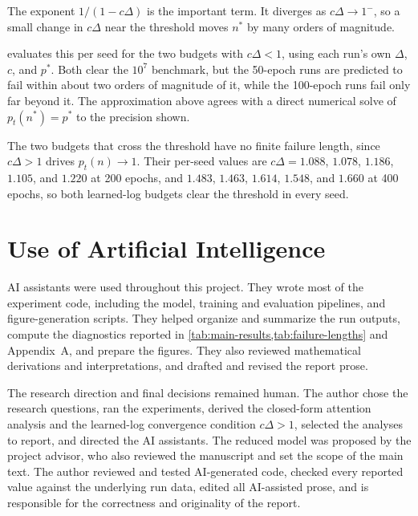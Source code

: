 \documentclass{article}
\begin{document}
The exponent $1/(1-c\Delta)$ is the important term. It diverges as
$c\Delta\to1^{-}$, so a small change in $c\Delta$ near the threshold moves
$n^{\ast}$ by many orders of magnitude.

 evaluates this per seed for the two budgets with
$c\Delta<1$, using each run's own $\Delta$, $c$, and $p^{\ast}$. Both clear the
$10^7$ benchmark, but the 50-epoch runs are predicted to fail within about two
orders of magnitude of it, while the 100-epoch runs fail only far beyond it. The
approximation above agrees with a direct numerical solve of
$p_t(n^{\ast})=p^{\ast}$ to the precision shown.

The two budgets that cross the threshold have no finite failure length, since
$c\Delta>1$ drives $p_t(n)\to1$. Their per-seed values are
$c\Delta=1.088$, $1.078$, $1.186$, $1.105$, and $1.220$ at 200 epochs, and
$1.483$, $1.463$, $1.614$, $1.548$, and $1.660$ at 400 epochs, so both
learned-log budgets clear the threshold in every seed.

\section*{Use of Artificial Intelligence}

AI assistants were used throughout this project. They wrote most of the
experiment code, including the model, training and evaluation pipelines, and
figure-generation scripts. They helped organize and summarize the run outputs,
compute the diagnostics reported in \cref{tab:main-results,tab:failure-lengths}
and Appendix~A, and prepare the figures. They also reviewed mathematical
derivations and interpretations, and drafted and revised the report prose.

The research direction and final decisions remained human. The author chose the
research questions, ran the experiments, derived the closed-form attention
analysis and the learned-log convergence condition $c\Delta>1$, selected the analyses to report, and
directed the AI assistants. The reduced model was proposed by the project
advisor, who also reviewed the manuscript and set the scope of the main text.
The author reviewed and tested AI-generated code, checked every reported value
against the underlying run data, edited all AI-assisted prose, and is
responsible for the correctness and originality of the report.




\end{document}
